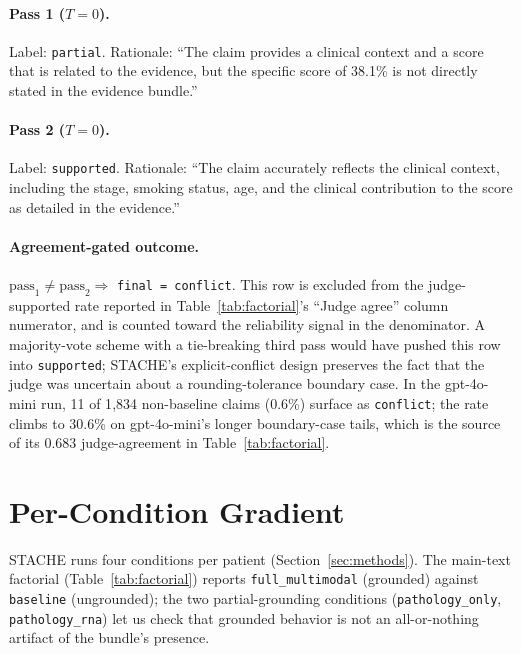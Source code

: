 \documentclass[11pt]{article}
\begin{document}
\paragraph{Pass 1 ($T{=}0$).} Label: \texttt{partial}. Rationale: ``The claim provides a clinical context and a score that is related to the evidence, but the specific score of 38.1\% is not directly stated in the evidence bundle.''

\paragraph{Pass 2 ($T{=}0$).} Label: \texttt{supported}. Rationale: ``The claim accurately reflects the clinical context, including the stage, smoking status, age, and the clinical contribution to the score as detailed in the evidence.''

\paragraph{Agreement-gated outcome.} $\text{pass}_1 \ne \text{pass}_2 \Rightarrow$ \texttt{final = conflict}. This row is excluded from the judge-supported rate reported in Table~\ref{tab:factorial}'s ``Judge agree'' column numerator, and is counted toward the reliability signal in the denominator. A majority-vote scheme with a tie-breaking third pass would have pushed this row into \texttt{supported}; STACHE's explicit-conflict design preserves the fact that the judge was uncertain about a rounding-tolerance boundary case. In the gpt-4o-mini run, 11 of 1{,}834 non-baseline claims (0.6\%) surface as \texttt{conflict}; the rate climbs to 30.6\% on gpt-4o-mini's longer boundary-case tails, which is the source of its 0.683 judge-agreement in Table~\ref{tab:factorial}.

\section{Per-Condition Gradient}
\label{app:conditions}

STACHE runs four conditions per patient (Section~\ref{sec:methods}). The main-text factorial (Table~\ref{tab:factorial}) reports \texttt{full\_multimodal} (grounded) against \texttt{baseline} (ungrounded); the two partial-grounding conditions (\texttt{pathology\_only}, \texttt{pathology\_rna}) let us check that grounded behavior is not an all-or-nothing artifact of the bundle's presence.
\end{document}
